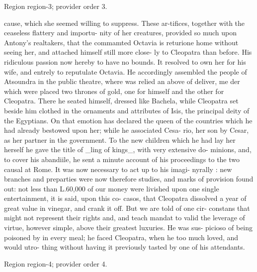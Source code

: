 \documentclass[11pt]{article}
\begin{document}
{\scriptsize\color{gray} Region region-3; provider order 3.\par}
\medskip

cause, which she seemed willing to suppress. These ar-tifices, together with the ceaseless flattery and importu- nity of her creatures, provided so much upon Antony's realtakers, that the commamted Octavia is returione home without seeing her, and attached himself still more close- ly to Cleopatra than before. His ridiculous passion now hereby to have no bounds. It resolved to own her for his wife, and entrely to reputulate Octavia. He accordingly assembled the people of Atsoundra in the public theatre, where was relied an above of deliver, me der which were placed two thrones of gold, one for himself and the other for Cleopatra. There he seated himself, dressed like Bachela, while Cleopatra set beside him clothed in the ornaments and attributes of Isis, the principal deity of the Egyptians. On that emotion has declared the queen of the countries which he had already bestowed upon her; while he associated Cesa- rio, her son by Cesar, as her partner in the government. To the new children which he had lay her herself he gave the title of \_ling of kings\_, with very extensive do- minions, and, to cover his abandiile, he sent a minute account of his proceedings to the two causal at Rome. It was now necessary to act up to his imagi- nyrally : new branches and preparties were now therefore studies, and marks of provision found out: not less than L.60,000 of our money were livished upon one single entertainment, it is said, upon this co- casos, that Cleopatra dissolved a year of great value in vinegar, and crank it off. But we are told of one cir- constans that might not represent their rights and, and teach mandat to valid the leverage of virtue, however simple, above their greatest luxuries. He was sus- picioso of being poisoned by in every meal; he faced Cleopatra, when he too much loved, and would utro- thing without having it previously tasted by one of his attendants.
\par

{\scriptsize\color{gray} Region region-4; provider order 4.\par}
\medskip
\end{document}
